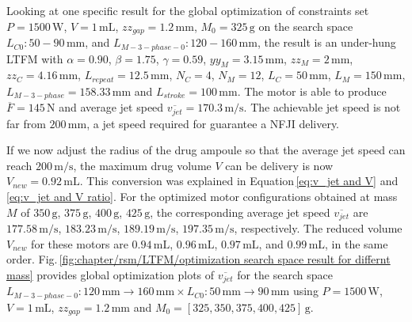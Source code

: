             
            Looking at one specific result for the global optimization of constraints set $P=1500\,\mathrm{W}$, $V=1\,\mathrm{mL}$, $zz_{gap}=1.2\,\mathrm{mm}$, $M_0=325\,\mathrm{g}$ on the search space $L_{C0}:50-90\,\mathrm{mm}$, and $L_{M-3-phase-0}:120-160\,\mathrm{mm}$, the result is an under-hung \acs{LTFM} with $\alpha=0.90$, $\beta=1.75$, $\gamma=0.59$, $yy_M=3.15\,\mathrm{mm}$, $zz_M=2\,\mathrm{mm}$, $zz_C=4.16\,\mathrm{mm}$, $L_{repeat}=12.5\,\mathrm{mm}$, $N_C=4$, $N_M=12$, $L_C=50\,\mathrm{mm}$, $L_M=150\,\mathrm{mm}$, $L_{M-3-phase}=158.33\,\mathrm{mm}$ and $L_{stroke}=100\,\mathrm{mm}$. The motor is able to produce $\overline{F} = 145\,\mathrm{N}$ and average jet speed $\overline{v_{jet}}=170.3\,\mathrm{m/s}$. The achievable jet speed is not far from $200\,\mathrm{mm}$, a jet speed required for guarantee a \acs{NFJI} delivery. 
            
            
            If we now adjust the radius of the drug ampoule so that the average jet speed can reach $200\,\mathrm{m/s}$, the maximum drug volume $V$ can be delivery is now $V_{new}=0.92\,\mathrm{mL}$. This conversion was explained in Equation\,\ref{eq:v_jet and V} and \ref{eq:v_jet and V ratio}. For the optimized motor configurations obtained at mass $M$ of $350\,\mathrm{g}$, $375\,\mathrm{g}$, $400\,\mathrm{g}$, $425\,\mathrm{g}$, the corresponding average jet speed $\overline{v_{jet}}$ are $177.58\,\mathrm{m/s}$, $183.23\,\mathrm{m/s}$, $189.19\,\mathrm{m/s}$, $197.35\,\mathrm{m/s}$, respectively. The reduced volume $V_{new}$ for these motors are $0.94\,\mathrm{mL}$, $0.96\,\mathrm{mL}$, $0.97\,\mathrm{mL}$, and $0.99\,\mathrm{mL}$, in the same order. Fig.\,\ref{fig:chapter/rsm/LTFM/optimization search space result for differnt mass} provides global optimization plots of $\overline{v_{jet}}$ for the search space $L_{M-3-phase-0}:120\,\mathrm{mm}\rightarrow 160\,\mathrm{mm} \times L_{C0}:50\,\mathrm{mm}\rightarrow 90\,\mathrm{mm}$ using $P=1500\,\mathrm{W}$, $V=1\,\mathrm{mL}$, $zz_{gap}=1.2\,\mathrm{mm}$ and $M_0=[325,350,375,400,425]\,\mathrm{g}$. 
        
